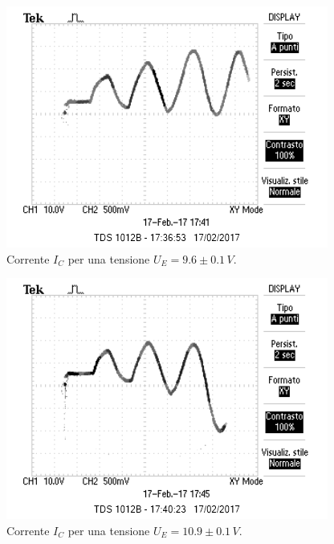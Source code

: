 \documentclass[10pt,a4paper]{article}
\begin{document}
\begin{figure}[!htb]
  \centering
  \includegraphics[scale=1.0]{ue9punto680volts.png}
\caption{Corrente $I_C$ per una tensione $U_E = 9.6 \pm 0.1\, V$.\label{fig:grafico2}}

\end{figure}


\begin{figure}[!htb]
  \centering
  \includegraphics[scale=1.0]{ue10punto970volts.png}
\caption{Corrente $I_C$ per una tensione $U_E = 10.9 \pm 0.1\, V$.\label{fig:grafico3}}

\end{figure}
\end{document}
